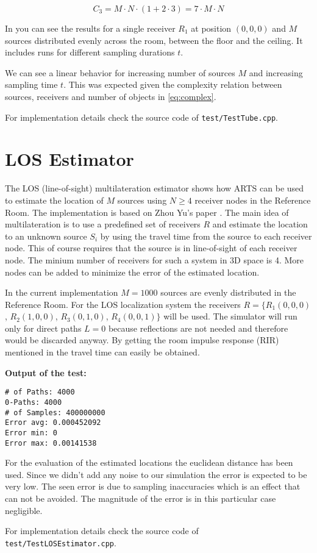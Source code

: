 \begin{equation}
    C_3 = M \cdot N \cdot (1 + 2 \cdot 3) = 7 \cdot M \cdot N
\end{equation}

In  you can see the results for a single receiver $R_1$ at position $(0,0,0)$ and $M$ sources distributed evenly across the room, between the floor and the ceiling.
It includes runs for different sampling durations $t$.



We can see a linear behavior for increasing number of sources $M$ and increasing sampling time $t$.
This was expected given the complexity relation between sources, receivers and number of objects in \eqref{eq:complex}.

For implementation details check the source code of \texttt{test/TestTube.cpp}.

\section{LOS Estimator}
The LOS (line-of-sight) multilateration estimator shows how ARTS can be used to estimate the location of $M$ sources using $N \geq 4$ receiver nodes in the Reference Room.
The implementation is based on Zhou Yu's paper \cite{zhou2009efficient}.
The main idea of multilateration is to use a predefined set of receivers $R$ and estimate the location to an unknown source $S_i$ by using the travel time from the source to each receiver node.
This of course requires that the source is in line-of-sight of each receiver node.
The minium number of receivers for such a system in 3D space is 4.
More nodes can be added to minimize the error of the estimated location.

In the current implementation $M=1000$ sources are evenly distributed in the Reference Room.
For the LOS localization system the receivers $R = \{ R_1(0,0,0)$, $R_2(1,0,0)$, $R_3(0,1,0)$, $R_4(0,0,1) \}$ will be used.
The simulator will run only for direct paths $L=0$ because reflections are not needed and therefore would be discarded anyway.
By getting the room impulse response (RIR) mentioned in  the travel time can easily be obtained.

\textbf{Output of the test:}
\begin{verbatim}
# of Paths: 4000
0-Paths: 4000
# of Samples: 400000000
Error avg: 0.000452092
Error min: 0
Error max: 0.00141538
\end{verbatim}

For the evaluation of the estimated locations the euclidean distance has been used.
Since we didn't add any noise to our simulation the error is expected to be very low.
The seen error is due to sampling inaccuracies which is an effect that can not be avoided.
The magnitude of the error is in this particular case negligible.

For implementation details check the source code of \texttt{test/TestLOSEstimator.cpp}.
